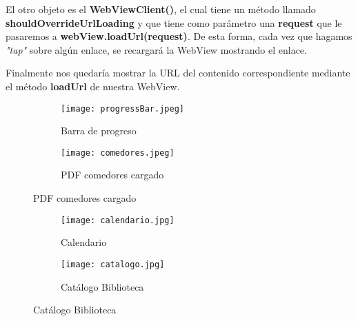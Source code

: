 El otro objeto es el \textbf{WebViewClient()}, el cual tiene un método llamado \textbf{shouldOverrideUrlLoading} y que tiene como parámetro una \textbf{request} que le pasaremos a \textbf{webView.loadUrl(request)}. De esta forma, cada vez que hagamos \textit{"tap"} sobre algún enlace, se recargará la WebView mostrando el enlace.

Finalmente nos quedaría mostrar la URL del contenido correspondiente  mediante el método \textbf{loadUrl} de nuestra WebView.

\begin{figure}[H]
  \begin{subfigure}{0.5\textwidth}
    \centering
    \texttt{[image: progressBar.jpeg]}
    \caption{Barra de progreso}
    \label{fig:sub-first}
  \end{subfigure}
  \begin{subfigure}{0.5\textwidth}
    \centering
    \texttt{[image: comedores.jpeg]}
    \caption{PDF comedores cargado}
    \label{fig:sub-second}
  \end{subfigure}
\end{figure}

\begin{figure}[H]
  \begin{subfigure}{0.5\textwidth}
    \centering
    \texttt{[image: calendario.jpg]}
    \caption{Calendario}
    \label{fig:sub-first}
  \end{subfigure}
  \begin{subfigure}{0.5\textwidth}
    \centering
    \texttt{[image: catalogo.jpg]}
    \caption{Catálogo Biblioteca}
    \label{fig:sub-second}
  \end{subfigure}
\end{figure}

